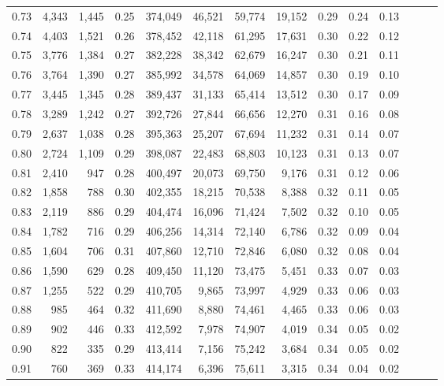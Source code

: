 \begin{tabular}{rrrrrrrrrrrrrr}
0.73 &  4,343 &  1,445 &  0.25 &  374,049 &   46,521 &  59,774 &  19,152 &  0.29 &  0.24 &      0.13 \\
0.74 &  4,403 &  1,521 &  0.26 &  378,452 &   42,118 &  61,295 &  17,631 &  0.30 &  0.22 &      0.12 \\
0.75 &  3,776 &  1,384 &  0.27 &  382,228 &   38,342 &  62,679 &  16,247 &  0.30 &  0.21 &      0.11 \\
0.76 &  3,764 &  1,390 &  0.27 &  385,992 &   34,578 &  64,069 &  14,857 &  0.30 &  0.19 &      0.10 \\
0.77 &  3,445 &  1,345 &  0.28 &  389,437 &   31,133 &  65,414 &  13,512 &  0.30 &  0.17 &      0.09 \\
0.78 &  3,289 &  1,242 &  0.27 &  392,726 &   27,844 &  66,656 &  12,270 &  0.31 &  0.16 &      0.08 \\
0.79 &  2,637 &  1,038 &  0.28 &  395,363 &   25,207 &  67,694 &  11,232 &  0.31 &  0.14 &      0.07 \\
0.80 &  2,724 &  1,109 &  0.29 &  398,087 &   22,483 &  68,803 &  10,123 &  0.31 &  0.13 &      0.07 \\
0.81 &  2,410 &    947 &  0.28 &  400,497 &   20,073 &  69,750 &   9,176 &  0.31 &  0.12 &      0.06 \\
0.82 &  1,858 &    788 &  0.30 &  402,355 &   18,215 &  70,538 &   8,388 &  0.32 &  0.11 &      0.05 \\
0.83 &  2,119 &    886 &  0.29 &  404,474 &   16,096 &  71,424 &   7,502 &  0.32 &  0.10 &      0.05 \\
0.84 &  1,782 &    716 &  0.29 &  406,256 &   14,314 &  72,140 &   6,786 &  0.32 &  0.09 &      0.04 \\
0.85 &  1,604 &    706 &  0.31 &  407,860 &   12,710 &  72,846 &   6,080 &  0.32 &  0.08 &      0.04 \\
0.86 &  1,590 &    629 &  0.28 &  409,450 &   11,120 &  73,475 &   5,451 &  0.33 &  0.07 &      0.03 \\
0.87 &  1,255 &    522 &  0.29 &  410,705 &    9,865 &  73,997 &   4,929 &  0.33 &  0.06 &      0.03 \\
0.88 &    985 &    464 &  0.32 &  411,690 &    8,880 &  74,461 &   4,465 &  0.33 &  0.06 &      0.03 \\
0.89 &    902 &    446 &  0.33 &  412,592 &    7,978 &  74,907 &   4,019 &  0.34 &  0.05 &      0.02 \\
0.90 &    822 &    335 &  0.29 &  413,414 &    7,156 &  75,242 &   3,684 &  0.34 &  0.05 &      0.02 \\
0.91 &    760 &    369 &  0.33 &  414,174 &    6,396 &  75,611 &   3,315 &  0.34 &  0.04 &      0.02 \\

\end{tabular}
